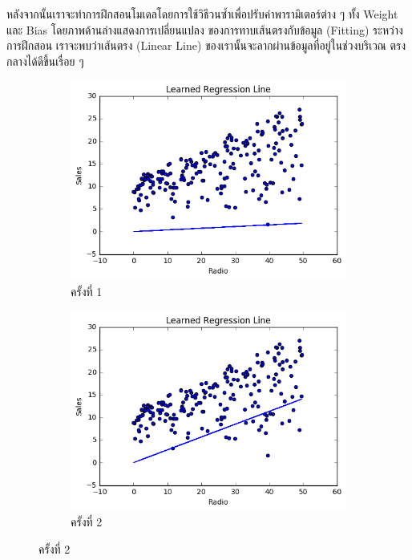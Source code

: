 หลังจากนั้นเราจะทำการฝึกสอนโมเดลโดยการใช้วิธีวนซ้ำเพื่อปรับค่าพารามิเตอร์ต่าง ๆ ทั้ง Weight และ Bias โดยภาพด้านล่างแสดงการเปลี่ยนแปลง%
ของการทาบเส้นตรงกับข้อมูล (Fitting) ระหว่างการฝึกสอน เราจะพบว่าเส้นตรง (Linear Line) ของเรานั้นจะลากผ่านข้อมูลที่อยู่ในช่วงบริเวณ%
ตรงกลางได้ดีขึ้นเรื่อย ๆ 

\begin{figure}[htbp]
    \centering
    \begin{subfigure}{0.5\textwidth}
        \centering
        \includegraphics[width=0.9\linewidth]{fig/plot_simple_reg_1.png}
        \caption{ครั้งที่ 1}
        \label{fig:plot_simple_reg_1}
    \end{subfigure}%
    \begin{subfigure}{0.5\textwidth}
        \centering
        \includegraphics[width=0.9\linewidth]{fig/plot_simple_reg_2.png}
        \caption{ครั้งที่ 2}
        \label{fig:plot_simple_reg_2}
    \end{subfigure}

\end{figure}

